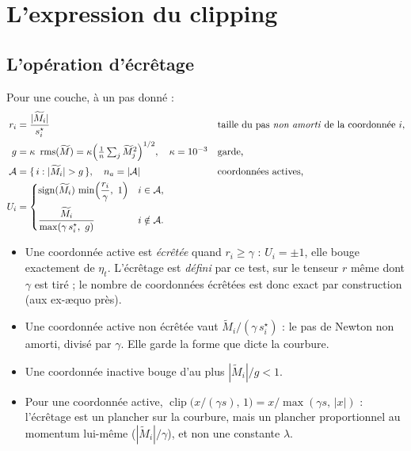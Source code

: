 \documentclass[11pt,a4paper]{article}
\newcommand{\Mt}{\widetilde{M}}
\DeclareMathOperator{\sign}{sign}
\DeclareMathOperator{\rms}{rms}
\begin{document}
\section{L'expression du clipping}

\subsection{L'opération d'écrêtage}

Pour une couche, à un pas donné :
\begin{align}
  r_i &= \frac{|\Mt_i|}{s^\star_i}
      && \text{taille du pas \emph{non amorti} de la coordonnée } i, \label{eq:r}\\
  g &= \kappa\ \rms(\Mt) = \kappa\Bigl(\tfrac1n\textstyle\sum_j \Mt_j^2\Bigr)^{1/2},\quad \kappa = 10^{-3}
      && \text{garde,} \label{eq:guard}\\
  \mathcal A &= \{\, i : |\Mt_i| > g \,\}, \quad n_a = |\mathcal A|
      && \text{coordonnées actives,} \label{eq:active}\\
  U_i &=
  \begin{cases}
    \sign(\Mt_i)\,\min\Bigl(\dfrac{r_i}{\gamma},\ 1\Bigr) & i \in \mathcal A, \\[10pt]
    \dfrac{\Mt_i}{\max(\gamma\, s^\star_i,\ g)} & i \notin \mathcal A.
  \end{cases} \label{eq:U}
\end{align}
\begin{itemize}
  \item Une coordonnée active est \emph{écrêtée} quand $r_i \ge \gamma$ : $U_i = \pm1$, elle bouge
        exactement de $\eta_t$. L'écrêtage est \emph{défini} par ce test, sur le tenseur $r$ même dont
        $\gamma$ est tiré ; le nombre de coordonnées écrêtées est donc exact par construction (aux
        ex-æquo près).
  \item Une coordonnée active non écrêtée vaut $\Mt_i/(\gamma\, s^\star_i)$ : le pas de Newton non
        amorti, divisé par $\gamma$. Elle garde la forme que dicte la courbure.
  \item Une coordonnée inactive bouge d'au plus $|\Mt_i|/g < 1$.
  \item Pour une coordonnée active, $\operatorname{clip}\bigl(x/(\gamma s),\,1\bigr) = x/\max(\gamma s,\,|x|)$ :
        l'écrêtage est un plancher sur la courbure, mais un plancher proportionnel au momentum
        lui-même ($|\Mt_i|/\gamma$), et non une constante $\lambda$.
\end{itemize}
\end{document}

